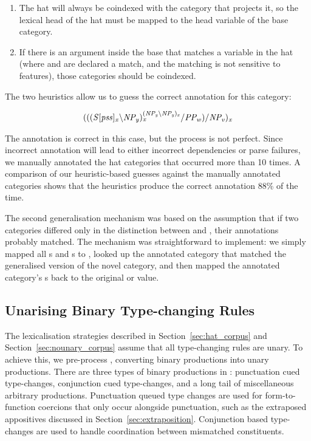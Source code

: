 \begin{enumerate}
 \item The hat will always be coindexed with the category that projects it, so
the lexical head of the hat must be mapped to the head variable of the base
category.
 \item If there is an argument inside the base that matches a variable in the
hat (where  and  are declared a match, and the matching is not
sensitive to features), those categories should be coindexed.
\end{enumerate}

The two heuristics allow us to guess the correct annotation for this category:
 
\begin{eqnarray}
\mbox{$\it{(((S[pss]_x\backslash NP_y)_x^{(NP_y\backslash NP_y)_x}/PP_w)/NP_v)_x}$} 
\end{eqnarray}

 The annotation is correct in this case, but the process is not perfect. Since
incorrect annotation will lead to either incorrect dependencies or parse
failures, we manually annotated the hat categories that occurred more than 10
times. A comparison of our heuristic-based guesses against the manually
annotated categories shows that the heuristics produce the correct annotation
88\% of the time.

The second generalisation mechanism was based on the assumption that if two
categories differed only in the distinction between  and , their
annotations probably matched. The mechanism was straightforward to implement: we
simply mapped all s and s to , looked up the annotated
category that matched the generalised version of the novel category, and then
mapped the annotated category's s back to the original  or 
value. 

\subsection{Unarising Binary Type-changing Rules}
\label{sec:unarising}
The lexicalisation strategies described in Section~\ref{sec:hat_corpus} and
Section~\ref{sec:nounary_corpus} assume that all type-changing rules are
unary. To achieve this, we pre-process \ccgbank, converting binary productions
into unary productions. There are three types of binary productions in \ccgbank:
punctuation cued type-changes, conjunction cued type-changes, and a long tail of
miscellaneous arbitrary productions. Punctuation queued type changes are used
for form-to-function coercions that only occur alongside punctuation, such as
the extraposed appositives discussed in Section~\ref{sec:extraposition}.
Conjunction based type-changes are used to handle coordination between
mismatched constituents.

